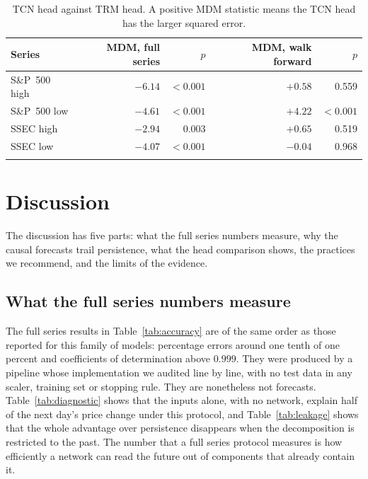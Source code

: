 \documentclass[pdflatex,sn-mathphys-num]{sn-jnl}%
\theoremstyle{thmstyleone}%
\theoremstyle{thmstyletwo}%
\theoremstyle{thmstylethree}%
\begin{document}
\begin{table}[ht]
\caption{TCN head against TRM head. A positive MDM statistic means the TCN head has the larger squared error.}
\label{tab:heads}
\centering
\begin{tabular}{@{}lrrrr@{}}
\toprule
Series & MDM, full series & $p$ & MDM, walk forward & $p$ \\
\midrule
S\&P~500 high & ${-}6.14$ & $<0.001$ & ${+}0.58$ & 0.559 \\
S\&P~500 low & ${-}4.61$ & $<0.001$ & ${+}4.22$ & $<0.001$ \\
SSEC high & ${-}2.94$ & 0.003 & ${+}0.65$ & 0.519 \\
SSEC low & ${-}4.07$ & $<0.001$ & ${-}0.04$ & 0.968 \\
\botrule
\end{tabular}
\end{table}

\section{Discussion}\label{sec:discussion}

The discussion has five parts: what the full series numbers measure, why the
causal forecasts trail persistence, what the head comparison shows, the
practices we recommend, and the limits of the evidence.

\subsection{What the full series numbers measure}
The full series results in Table~\ref{tab:accuracy} are of the same order as
those reported for this family of models: percentage errors around one tenth
of one percent and coefficients of determination above $0.999$. They were
produced by a pipeline whose implementation we audited line by line, with no
test data in any scaler, training set or stopping rule. They are nonetheless
not forecasts. Table~\ref{tab:diagnostic} shows that the inputs alone, with no
network, explain half of the next day's price change under this protocol, and
Table~\ref{tab:leakage} shows that the whole advantage over persistence
disappears when the decomposition is restricted to the past. The number that a
full series protocol measures is how efficiently a network can read the future
out of components that already contain it.
\end{document}
